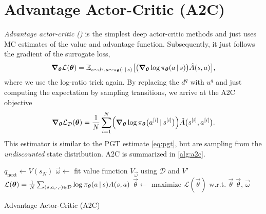 	\section{Advantage Actor-Critic (\acs{A2C})}
		\emph{Advantage actor-critic ()} is the simplest deep actor-critic methods and just uses \ac{MC} estimates of the value and advantage function. Subsequently, it just follows the gradient of the surrogate loss,
		\begin{equation}
			\grad_{\bm{\theta}} \mathcal{L}(\bm{\theta})
			= \mathbb{E}_{s \sim d^q, a \sim \pi_{\bm{\theta}}(\cdot \,\vert\, s)}\bigl[ \bigl( \grad_{\bm{\theta}} \log \pi_{\bm{\theta}}(a \,\vert\, s) \bigr) \hat{A}(s, a) \bigr],
		\end{equation}
		where we use the log-ratio trick again. By replacing the \(d^q\) with \(u^q\) and just computing the expectation by sampling transitions, we arrive at the \ac{A2C} objective
		\begin{equation}
			\grad_{\bm{\theta}} \mathcal{L}_\mathcal{D}(\bm{\theta}) = \frac{1}{N} \sum_{i = 1}^{N} \Bigl( \grad_{\bm{\theta}} \log \pi_{\bm{\theta}}\bigl(a^{[i]} \,\vert\, s^{[i]}\bigr) \Bigr) \hat{A}\bigl(s^{[i]}, a^{[i]}\bigr).
		\end{equation}
		This estimator is similar to the \ac{PGT} estimate \eqref{eq:pgt}, but are sampling from the \emph{undiscounted} state distribution. \ac{A2C} is summarized in \autoref{alg:a2c}.

		\begin{algorithm}  \DontPrintSemicolon
			 \;
			\( q_\mathrm{next} \gets V(s_N) \) \;
			\( \vec{\omega} \gets \) fit value function \(V_{\vec{\omega}}\) using \(\mathcal{D}\) and \(V'\) \;
			\( \mathcal{L}(\bm{\theta}) = \frac{1}{N} \sum_{(s, a, \cdot, \cdot) \in \mathcal{D}} \log \pi_{\bm{\theta}}(a \,\vert\, s) A(s, a) \) \;
			\( \vec{\theta} \gets \) maximize \(\mathcal{L}(\vec{\theta})\) w.r.t. \(\vec{\theta}\) \;
			\Return \(\vec{\theta}\), \(\vec{\omega}\) \;
			\caption{Advantage Actor-Critic (\acs{A2C})}
			\label{alg:a2c}
		\end{algorithm}

